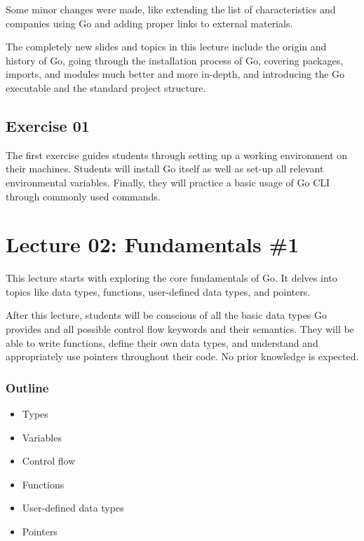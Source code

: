 \documentclass[
  digital,
  color,
  oneside,
  nosansbold,
  nocolorbold,
  nolof,
  nolot,
]{fithesis4}
\begin{document}
Some minor changes were made, like extending the list of characteristics and companies using Go and adding proper links to external materials.

The completely new slides and topics in this lecture include the origin and history of Go, going through the installation process of Go, covering packages, imports, and modules much better and more in-depth, and introducing the Go executable and the standard project structure.

\subsection{Exercise 01}

The first exercise guides students through setting up a working environment on their machines. Students will install Go itself as well as set-up all relevant environmental variables. Finally, they will practice a basic usage of Go CLI through commonly used commands.

\section{Lecture 02: Fundamentals \#1}\label{lecture-fundamentals-01}

This lecture starts with exploring the core fundamentals of Go. It delves into topics like data types, functions, user-defined data types, and pointers.

After this lecture, students will be conscious of all the basic data types Go provides and all possible control flow keywords and their semantics. They will be able to write functions, define their own data types, and understand and appropriately use pointers throughout their code. No prior knowledge is expected.

\subsubsection{Outline}

\begin{itemize}
    \item Types
    \item Variables
    \item Control flow
    \item Functions
    \item User-defined data types
    \item Pointers
\end{itemize}
\end{document}
